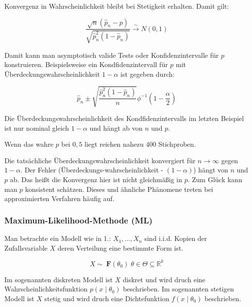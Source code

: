 \documentclass[10pt]{article}
\newcommand{\FZV}{X_1, \ldots, X_n} %
\newcommand{\IR}{\mathbb{R}} %
\newcommand{\KV}{\overset{\sim} \longrightarrow} %
\newenvironment{BSP}[1][]
{\begin{Beispiel}[frametitle=#1]}{\end{Beispiel}}
\begin{document}
\begin{BSP}[Beispiel 1..... (Delta-Methode)]
		Konvergenz in Wahrscheinlichkeit bleibt bei Stetigkeit erhalten. Damit gilt:
		
		\begin{equation*}
			\frac{\sqrt{n}(\hat{p}_n-p)}{\sqrt{\hat{p}_n^2(1-\hat{p}_n)}} \KV N(0,1)
		\end{equation*}
		
		Damit kann man asymptotisch valide Tests oder Konfidenzintervalle für $p$ konstruieren. Beispielsweise ein Kondfidenzintervall für $p$ mit Überdeckungswahrscheinlichkeit $1-\alpha$ ist gegeben durch:
		
		\begin{equation*}
			\hat{p}_n \pm \sqrt{\frac{\hat{p}_n^2 (1-\hat{p}_n)}{n}} \phi^{-1} \left(1-\frac{\alpha}{2}\right)
		\end{equation*}
		
	\end{BSP}
	
	\noindent Die Überdeckungswahrscheinlichkeit des Kondfidenzintervalls im letzten Beispiel ist nur nominal gleich $1-\alpha$ und hängt ab von $n$ und $p$. 
	
	\noindent Wenn das wahre $p$ bei $0,5$ liegt reichen nahezu $400$ Stichproben. 
	
	\noindent Die tatsächliche Überdeckungswahrscheinlichkeit konvergiert für  $n \rightarrow \infty$ gegen $1-\alpha$. Der Fehler (Überdeckungs-wahrscheinlichkeit - $(1-\alpha)$) hängt von $n$ und $p$ ab. Das heißt die Konvergenz hier ist nicht gleichmäßig in $p$. Zum Glück kann man $p$ konsistent schätzen. Dieses und ähnliche Phänomene treten bei approximierten Verfahren häufig auf. 
	
	
	\subsubsection{Maximum-Likelihood-Methode (ML)}
	
	Man betrachte ein Modell wie in 1.: $\FZV$ sind i.i.d. Kopien der Zufallsvariable $X$ deren Verteilung eine bestimmte Form ist. 
	
	\begin{equation*}
		X \sim \; \textbf{F}(\theta_0) \;	\theta \in \Theta \subseteq \IR^k
	\end{equation*}
	 
	\noindent Im sogenannten diskreten Modell ist $X$ diskret und wird druch eine Wahrscheinlichkeitsfunktion $p(x \mid \theta_0)$ beschrieben. 
	Im sogenannten stetigen Modell ist $X$ stetig und wird druch eine Dichtefunktion $f(x \mid \theta_0)$ beschrieben. 
	
\end{document}
